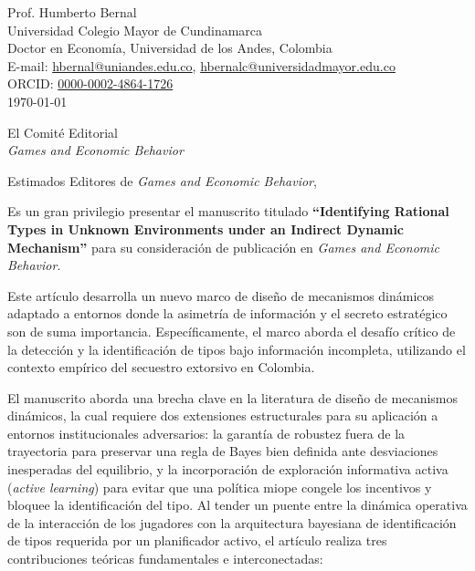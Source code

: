 \documentclass[12pt]{article}
\begin{document}
\singlespacing

\begin{flushright}
Prof. Humberto Bernal \\
Universidad Colegio Mayor de Cundinamarca \\
Doctor en Economía, Universidad de los Andes, Colombia \\
E-mail: \href{mailto:hbernal@uniandes.edu.co}{hbernal@uniandes.edu.co}, \href{mailto:hbernalc@universidadmayor.edu.co}{hbernalc@universidadmayor.edu.co} \\
ORCID: \href{https://orcid.org/0000-0002-4864-1726}{0000-0002-4864-1726} \\
\today
\end{flushright}

\vspace{1.5em}

\begin{flushleft}
El Comité Editorial \\
\textit{Games and Economic Behavior}
\end{flushleft}

\vspace{1.5em}

\noindent Estimados Editores de \textit{Games and Economic Behavior},

\vspace{1.5em}

\noindent Es un gran privilegio presentar el manuscrito titulado \textbf{``Identifying Rational Types in Unknown Environments under an Indirect Dynamic Mechanism''} para su consideración de publicación en \textit{Games and Economic Behavior}.

Este artículo desarrolla un nuevo marco de diseño de mecanismos dinámicos adaptado a entornos donde la asimetría de información y el secreto estratégico son de suma importancia. Específicamente, el marco aborda el desafío crítico de la detección y la identificación de tipos bajo información incompleta, utilizando el contexto empírico del secuestro extorsivo en Colombia.

El manuscrito aborda una brecha clave en la literatura de diseño de mecanismos dinámicos, la cual requiere dos extensiones estructurales para su aplicación a entornos institucionales adversarios: la garantía de robustez fuera de la trayectoria para preservar una regla de Bayes bien definida ante desviaciones inesperadas del equilibrio, y la incorporación de exploración informativa activa (\textit{active learning}) para evitar que una política miope congele los incentivos y bloquee la identificación del tipo. Al tender un puente entre la dinámica operativa de la interacción de los jugadores con la arquitectura bayesiana de identificación de tipos requerida por un planificador activo, el artículo realiza tres contribuciones teóricas fundamentales e interconectadas:
\end{document}
